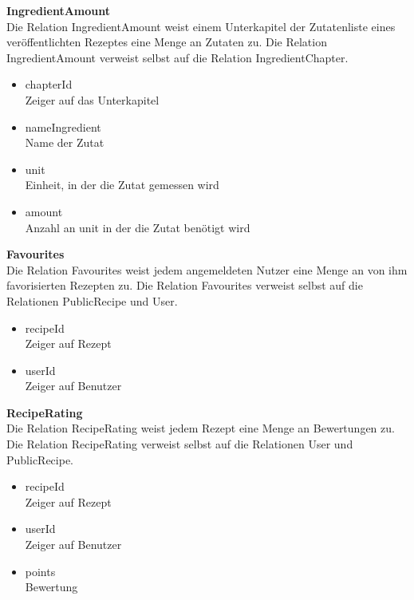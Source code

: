 \textbf{IngredientAmount}\\
Die Relation IngredientAmount weist einem Unterkapitel der Zutatenliste eines veröffentlichten Rezeptes eine Menge an Zutaten zu. Die Relation IngredientAmount verweist selbst auf die Relation IngredientChapter.

\begin{itemize}
	\item chapterId \\ Zeiger auf das Unterkapitel
	\item nameIngredient \\ Name der Zutat
	\item unit \\ Einheit, in der die Zutat gemessen wird
	\item amount \\ Anzahl an unit in der die Zutat benötigt wird
\end{itemize}

\textbf{Favourites}\\
Die Relation Favourites weist jedem angemeldeten Nutzer eine Menge an von ihm favorisierten Rezepten zu. Die Relation Favourites verweist selbst auf die Relationen PublicRecipe und User.

\begin{itemize}
	\item recipeId \\ Zeiger auf Rezept
	\item userId \\ Zeiger auf Benutzer
\end{itemize}

\textbf{RecipeRating}\\
Die Relation RecipeRating weist jedem Rezept eine Menge an Bewertungen zu. Die Relation RecipeRating verweist selbst auf die Relationen User und PublicRecipe.

\begin{itemize}
	\item recipeId \\ Zeiger auf Rezept
	\item userId \\ Zeiger auf Benutzer
	\item points \\ Bewertung
\end{itemize}


